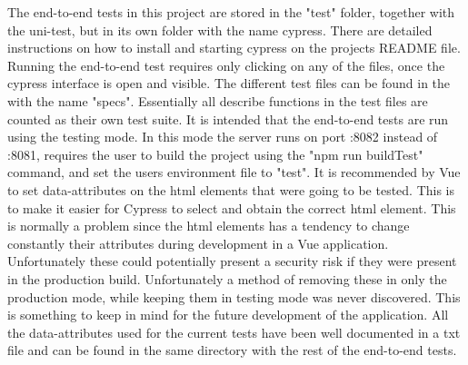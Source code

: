 The end-to-end tests in this project are stored in the "test" folder, together with the uni-test, but in its own folder with the name cypress. There are detailed instructions on how to install and starting cypress on the projects README file. Running the end-to-end test requires only clicking on any of the files, once the cypress interface is open and visible. The different test files can be found in the with the name "specs". Essentially all describe functions in the test files are counted as their own test suite. It is intended that the end-to-end tests are run using the testing mode. In this mode the server runs on port :8082 instead of :8081, requires the user to build the project using the "npm run buildTest" command, and set the users environment file to "test". It is recommended by Vue to set data-attributes on the html elements that were going to be tested. This is to make it easier for Cypress to select and obtain the correct html element. This is normally a problem since the html elements has a tendency to change constantly their attributes during development in a Vue application. Unfortunately these could potentially present a security risk if they were present in the production build. Unfortunately a method of removing these in only the production mode, while keeping them in testing mode was never discovered. This is something to keep in mind for the future development of the application. All the data-attributes used for the current tests have been well documented in a txt file and can be found in the same directory with the rest of the end-to-end tests.
